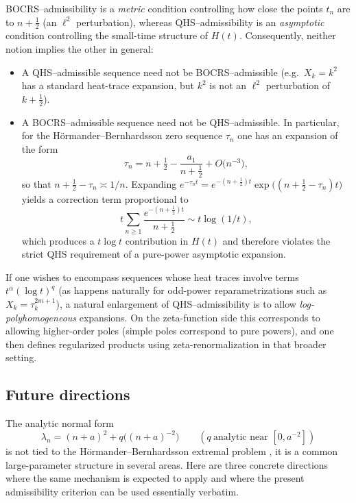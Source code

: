 \documentclass[11pt,letterpaper]{amsart}
\numberwithin{equation}{section}
\theoremstyle{definition}
\begin{document}
BOCRS--admissibility is a \emph{metric} condition controlling how close the points $t_n$
are to $n+\tfrac12$ (an $\ell^2$ perturbation), whereas QHS--admissibility is an
\emph{asymptotic} condition controlling the small-time structure of $H(t)$.
Consequently, neither notion implies the other in general:
\begin{itemize}
\item A QHS--admissible sequence need not be BOCRS--admissible (e.g.\ $X_k=k^2$ has a
standard heat-trace expansion, but $k^2$ is not an $\ell^2$ perturbation of $k+\tfrac12$).
\item A BOCRS--admissible sequence need not be QHS--admissible.  In particular, for the
H\"ormander--Bernhardsson zero sequence $\tau_n$ one has an expansion of the form
\[
\tau_n = n+\tfrac12-\frac{a_1}{n+\tfrac12}+O\bigl(n^{-3}\bigr),
\]
so that $n+\tfrac12-\tau_n\asymp 1/n$.  Expanding
$e^{-\tau_n t}=e^{-(n+\tfrac12)t}\exp\bigl((n+\tfrac12-\tau_n)t\bigr)$ yields a correction
term proportional to
\[
t\sum_{n\ge 1}\frac{e^{-(n+\tfrac12)t}}{n+\tfrac12}\sim t\log(1/t),
\]
which produces a $t\log t$ contribution in $H(t)$ and therefore violates the strict
QHS requirement of a pure-power asymptotic expansion.
\end{itemize}


If one wishes to encompass sequences whose heat traces involve terms
$t^\alpha(\log t)^q$ (as happens naturally for odd-power reparametrizations such as
$X_k=\tau_k^{2m+1}$), a natural enlargement of QHS--admissibility is to allow
\emph{log-polyhomogeneous} expansions.  On the zeta-function side this corresponds to
allowing higher-order poles (simple poles correspond to pure powers), and one then
defines regularized products using zeta-renormalization in that broader
setting.



\subsection{Future directions}
\label{subsec:portability-contexts}

The analytic normal form
\[
\lambda_n=(n+a)^2+q\bigl((n+a)^{-2}\bigr)\qquad(q\ \text{analytic near }[0,a^{-2}])
\]
is not tied to the H\"ormander--Bernhardsson extremal problem \cite{BOCRS}, it is a common large-parameter structure in several areas.  Here are three concrete directions where the same mechanism is expected to apply and where the present admissibility criterion can be used essentially verbatim.
\end{document}
